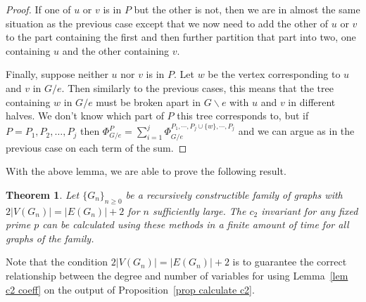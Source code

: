 \documentclass[12pt]{amsart}
\newtheorem{theorem}[definition]{Theorem}
\numberwithin{definition}{section}
\begin{document}
\begin{proof}
        If one of $u$ or $v$ is in $P$ but the other is not, then we are in almost the same situation as the previous case except that we now need to add the other of $u$ or $v$ to the part containing the first and then further partition that part into two, one containing $u$ and the other containing $v$.

        Finally, suppose neither $u$ nor $v$ is in $P$.  Let $w$ be the vertex corresponding to $u$ and $v$ in $G/e$. Then similarly to the previous cases, this means that the tree containing $w$ in $G/e$ must be broken apart in $G\backslash e$ with $u$ and $v$ in different halves.  We don't know which part of $P$ this tree corresponds to, but if $P = P_1, P_2, \ldots , P_j$ then $\Phi_{G/e}^{P} = \sum_{i=1}^j \Phi_{G/e}^{P_1, \cdots, P_j\cup\{w\}, \cdots, P_j}$ and we can argue as in the previous case on each term of the sum.
%        
\end{proof}

With the above lemma, we are able to prove the following result. 

\begin{theorem} Let $\{G_n\}_{n\geq 0}$ be a recursively constructible family of graphs with $2|V(G_n)| = |E(G_n)| + 2$ for $n$ sufficiently large.
The $c_2$ invariant for any fixed prime $p$ can be calculated using these methods in a finite amount of time for all graphs of the family.
  \label{thm finite}
\end{theorem}

Note that the condition $2|V(G_n)| = |E(G_n)| + 2$ is to guarantee the correct relationship between the degree and number of variables for using Lemma~\ref{lem c2 coeff} on the output of Proposition~\ref{prop calculate c2}.
\end{document}
